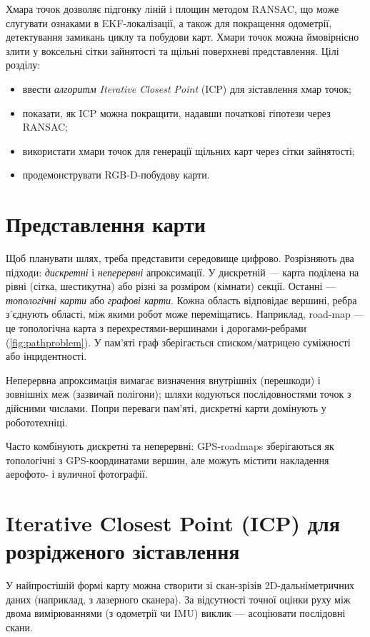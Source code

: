 Хмара точок дозволяє підгонку ліній і площин методом RANSAC, що може слугувати ознаками в EKF-локалізації, а також для покращення одометрії, детектування замикань циклу та побудови карт. Хмари точок можна ймовірнісно злити у воксельні сітки зайнятості та щільні поверхневі представлення. Цілі розділу:
\begin{itemize}
    \item ввести \emph{алгоритм Iterative Closest Point} (ICP) для зіставлення хмар точок;
    \item показати, як ICP можна покращити, надавши початкові гіпотези через RANSAC;
    \item використати хмари точок для генерації щільних карт через сітки зайнятості;
    \item продемонструвати RGB-D-побудову карти.
\end{itemize}

\section{Представлення карти}\label{sec:maps}
Щоб планувати шлях, треба представити середовище цифрово. Розрізняють два підходи: \emph{дискретні} і \emph{неперервні} апроксимації. У дискретній — карта поділена на рівні (сітка, шестикутна) або різні за розміром (кімнати) секції. Останні — \emph{топологічні карти} або \emph{графові карти}. Кожна область відповідає вершині, ребра з'єднують області, між якими робот може переміщатись. Наприклад, road-map — це топологічна карта з перехрестями-вершинами і дорогами-ребрами (\cref{fig:pathproblem}). У пам'яті граф зберігається списком/матрицею суміжності або інцидентності.

Неперервна апроксимація вимагає визначення внутрішніх (перешкоди) і зовнішніх меж (зазвичай полігони); шляхи кодуються послідовностями точок з дійсними числами. Попри переваги пам'яті, дискретні карти домінують у робототехніці.

Часто комбінують дискретні та неперервні: GPS-roadmaps зберігаються як топологічні з GPS-координатами вершин, але можуть містити накладення аерофото- і вуличної фотографії.

\section{Iterative Closest Point (ICP) для розрідженого зіставлення}\label{sec:ICP}
У найпростішій формі карту можна створити зі скан-зрізів 2D-дальніметричних даних (наприклад, з лазерного сканера). За відсутності точної оцінки руху між двома вимірюваннями (з одометрії чи IMU) виклик — асоціювати послідовні скани.

